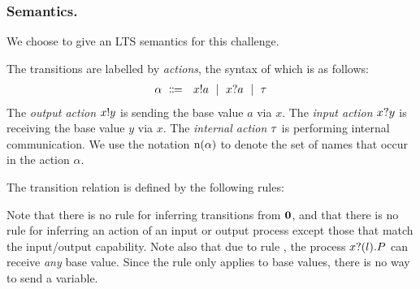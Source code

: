 \subsubsection{Semantics.} We choose to give an LTS semantics for this
challenge.

The transitions are labelled by \emph{actions}, the syntax
of which is as follows:
\begin{align*}
  \alpha\ \Coloneqq\ \ x ! a \ \mid\ x ? a \ \mid\ \tau
\end{align*}
The \emph{output action} \( x ! y \) is sending the base value
\( a \) via \( x \).  The \emph{input action} \( x ? y \) is
receiving the base value \( y \) via \( x \).  The \emph{internal
  action} \( \tau \) is performing internal communication.
%
We use the notation \( \textrm{n}(\alpha) \) to denote the set of
names that occur in the action \( \alpha \).

The transition relation is defined by the following rules:
Note that there is no rule for inferring transitions from \( \bm{0} \), and that there is no rule for inferring an action of an input or output process except those that match the input/output capability.
Note also that due to rule , the process \( x ? (l) . P \) can receive \emph{any} base value.
Since the rule  only applies to base values, there is no way to send a variable.


